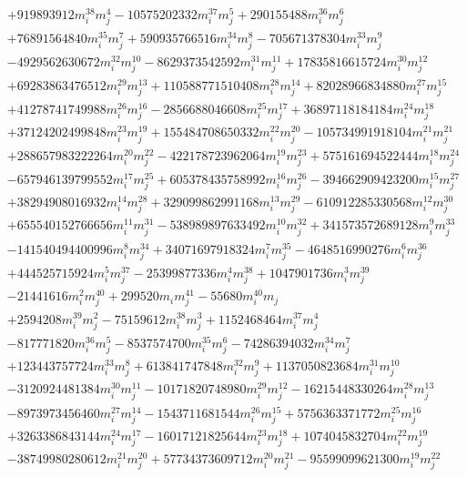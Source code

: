 {\begin{align*}
&+919893912m_i^{38}m_j^{4}-10575202332m_i^{37}m_j^{5}+290155488m_i^{36}m_j^{6}\\
&+76891564840m_i^{35}m_j^{7}+590935766516m_i^{34}m_j^{8}-705671378304m_i^{33}m_j^{9}\\
&-4929562630672m_i^{32}m_j^{10}-8629373542592m_i^{31}m_j^{11}+17835816615724m_i^{30}m_j^{12}\\
&+69283863476512m_i^{29}m_j^{13}+110588771510408m_i^{28}m_j^{14}+82028966834880m_i^{27}m_j^{15}\\
&+41278741749988m_i^{26}m_j^{16}-2856688046608m_i^{25}m_j^{17}+36897118184184m_i^{24}m_j^{18}\\
&+37124202499848m_i^{23}m_j^{19}+155484708650332m_i^{22}m_j^{20}-105734991918104m_i^{21}m_j^{21}\\
&+288657983222264m_i^{20}m_j^{22}-422178723962064m_i^{19}m_j^{23}+575161694522444m_i^{18}m_j^{24}\\
&-657946139799552m_i^{17}m_j^{25}+605378435758992m_i^{16}m_j^{26}-394662909423200m_i^{15}m_j^{27}\\
&+38294908016932m_i^{14}m_j^{28}+329099862991168m_i^{13}m_j^{29}-610912285330568m_i^{12}m_j^{30}\\
&+655540152766656m_i^{11}m_j^{31}-538989897633492m_i^{10}m_j^{32}+341573572689128m_i^{9}m_j^{33}\\
&-141540494400996m_i^{8}m_j^{34}+34071697918324m_i^{7}m_j^{35}-4648516990276m_i^{6}m_j^{36}\\
&+444525715924m_i^{5}m_j^{37}-25399877336m_i^{4}m_j^{38}+1047901736m_i^{3}m_j^{39}\\
&-21441616m_i^{2}m_j^{40}+299520m_im_j^{41}-55680m_i^{40}m_j\\
&+2594208m_i^{39}m_j^{2}-75159612m_i^{38}m_j^{3}+1152468464m_i^{37}m_j^{4}\\
&-817771820m_i^{36}m_j^{5}-8537574700m_i^{35}m_j^{6}-74286394032m_i^{34}m_j^{7}\\
&+123443757724m_i^{33}m_j^{8}+613841747848m_i^{32}m_j^{9}+1137050823684m_i^{31}m_j^{10}\\
&-3120924481384m_i^{30}m_j^{11}-10171820748980m_i^{29}m_j^{12}-16215448330264m_i^{28}m_j^{13}\\
&-8973973456460m_i^{27}m_j^{14}-1543711681544m_i^{26}m_j^{15}+5756363371772m_i^{25}m_j^{16}\\
&+3263386843144m_i^{24}m_j^{17}-16017121825644m_i^{23}m_j^{18}+1074045832704m_i^{22}m_j^{19}\\
&-38749980280612m_i^{21}m_j^{20}+57734373609712m_i^{20}m_j^{21}-95599099621300m_i^{19}m_j^{22}\\

\end{align*}}
